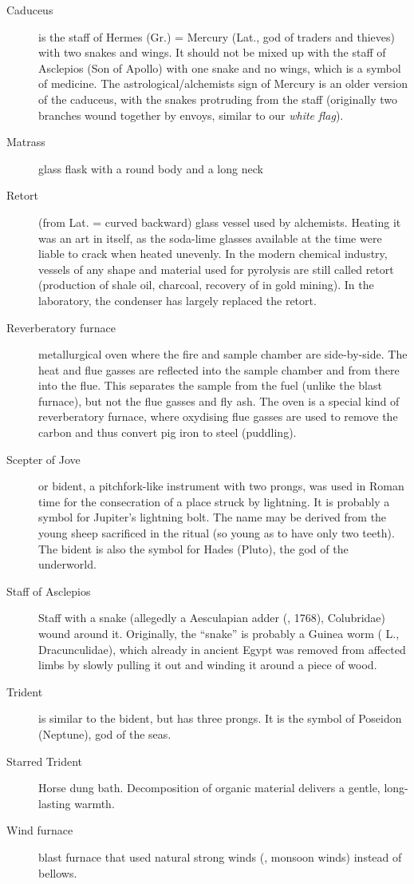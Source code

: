 \documentclass[british,final,landscape]{scrartcl}
\begin{document}
\begin{refsection}
\begin{description}
  \item[Caduceus]{is the staff of Hermes (Gr.) = Mercury (Lat., god of traders and thieves) with two snakes and wings. It should not be mixed up with the staff of Asclepios (Son of Apollo) with one snake and no wings, which is a symbol of medicine. The astrological/alchemists sign of Mercury is an older version of the caduceus, with the snakes protruding from the staff (originally two branches wound together by envoys, similar to our \emph{white flag}).}
  \item[Matrass]{glass flask with a round body and a long neck}
  \item[Retort]{(from Lat.  = curved backward) glass vessel used by alchemists. Heating it was an art in itself, as the soda-lime glasses available at the time were liable to crack when heated unevenly. In the modern chemical industry, vessels of any shape and material used for pyrolysis are still called retort (production of shale oil, charcoal, recovery of  in gold mining). In the laboratory, the  condenser has largely replaced the retort. }
  \item[Reverberatory furnace]{metallurgical oven where the fire and sample chamber are side-by-side. The heat and flue gasses are reflected into the sample chamber and from there into the flue. This separates the sample from the fuel (unlike the blast furnace), but not the flue gasses and fly ash. The  oven is a special kind of reverberatory furnace, where oxydising flue gasses are used to remove the carbon and thus convert pig iron to steel (puddling). }
  \item[Scepter of Jove]{or bident, a pitchfork-like instrument with two prongs, was used in Roman time for the consecration of a place struck by lightning. It is probably a symbol for Jupiter's lightning bolt. The name may be derived from the young sheep sacrificed in the ritual (so young as to have only two teeth). The bident is also the symbol for Hades (Pluto), the god of the underworld. }
  \item[Staff of Asclepios]{Staff with a snake (allegedly a Aesculapian adder  (, 1768), Colubridae)  wound around it. Originally, the ``snake'' is probably a Guinea worm ( L., Dracunculidae), which already in ancient Egypt was removed from affected limbs by slowly pulling it out and winding it around a piece of wood. }
  \item[Trident ]{is similar to the bident, but has three prongs. It is the symbol of Poseidon (Neptune), god of the seas. }
  \item[Starred Trident ]{}
  \item[]{Horse dung bath. Decomposition of organic material delivers a gentle, long-lasting warmth.}
  \item[Wind furnace]{blast furnace that used natural strong winds (, monsoon winds) instead of bellows. }
\end{description}


\end{refsection}
\end{document}
